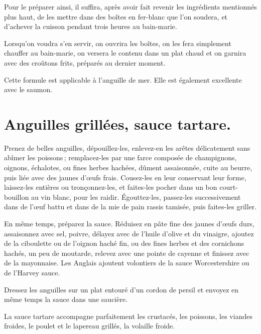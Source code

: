 Pour le préparer ainsi, il suffira, après avoir fait revenir les ingrédients
mentionnés plus haut, de les mettre dans des boîtes en fer-blanc que l’on
soudera, et d'achever la cuisson pendant trois heures au bain-marie.

Lorsqu'on voudra s'en servir, on ouvrira les boîtes, on les fera simplement
chauffer au bain-marie, on versera le contenu dans un plat chaud et on garnira
avec des croûtons frits, préparés au dernier moment.

\sk

Cette formule est applicable à l’anguille de mer. Elle est également excellente
avec le saumon.

\section*{\centering Anguilles grillées, sauce tartare.}

Prenez de belles anguilles, dépouillez-les, enlevez-en les arêtes délicatement
sans abîmer les poissons ; remplacez-les par une farce composée de champignons,
oignons, échalotes, ou fines herbes hachées, dûment assaisonnée, cuite au
beurre, puis liée avec des jaunes d'œufs frais. Cousez-les en leur conservant
leur forme, laissez-les entières ou tronçonnez-les, et faites-les pocher dans
un bon court-bouillon au vin blanc, pour les raidir. Égouttez-les, passez-les
successivement dans de l'œuf battu et dans de la mie de pain rassis tamisée,
puis faites-les griller.

En même temps, préparez la sauce. Réduisez en pâte fine des jaunes d'œufs durs,
assaisonnez avec sel, poivre, délayez avec de l'huile d'olive et du vinaigre,
ajoutez de la ciboulette ou de l'oignon haché fin, ou des fines herbes et des
cornichons hachés, un peu de moutarde, relevez avec une pointe de cayenne et
finissez avec de la mayonnaise. Les Anglais ajoutent volontiers de la sauce
Worcestershire ou de l'Harvey sauce.

Dressez les anguilles sur un plat entouré d'un cordon de persil et envoyez en
même temps la sauce dans une saucière.

\sk

La sauce tartare accompagne parfaitement les crustacés, les poissons, les
viandes froides, le poulet et le lapereau grillés, la volaille froide.


